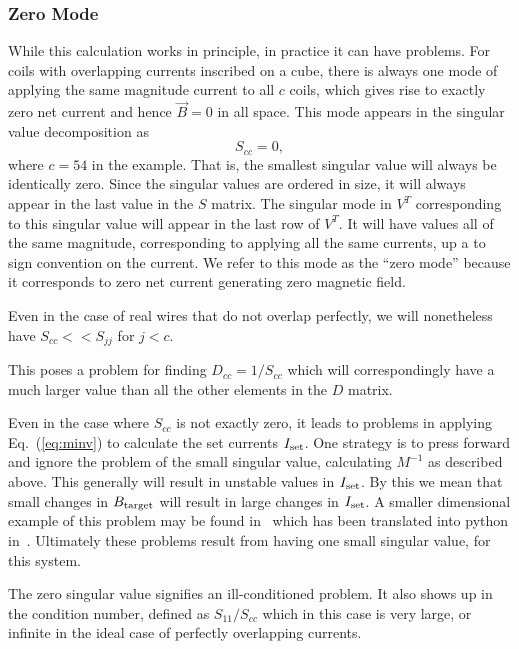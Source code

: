 \documentclass[preprint,12pt]{elsarticle}
\begin{document}
\subsubsection{Zero Mode}

While this calculation works in principle, in practice it can have
problems.  For coils with overlapping currents inscribed on a cube,
there is always one mode of applying the same magnitude current to all
$c$ coils, which gives rise to exactly zero net current and hence
$\vec{B}=0$ in all space.  This mode appears in the singular value
decomposition as
\begin{equation}
  S_{cc}=0,
\end{equation}
where $c=54$ in the example.  That is, the smallest singular value
will always be identically zero.  Since the singular values are
ordered in size, it will always appear in the last value in the $S$
matrix.  The singular mode in $V^T$ corresponding to this singular
value will appear in the last row of $V^T$.  It will have values all
of the same magnitude, corresponding to applying all the same
currents, up a to sign convention on the current.  We refer to this
mode as the ``zero mode'' because it corresponds to zero net current
generating zero magnetic field.

Even in the case of real wires that do not overlap perfectly, we will
nonetheless have $S_{cc}<<S_{jj}$ for $j<c$.

This poses a problem for finding $D_{cc}=1/S_{cc}$ which will
correspondingly have a much larger value than all the other elements
in the $D$ matrix.

Even in the case where $S_{cc}$ is not exactly zero, it leads to
problems in applying Eq.~(\ref{eq:minv}) to calculate the set currents
$I_{\rm set}$.  One strategy is to press forward and ignore the
problem of the small singular value, calculating $M^{-1}$ as described
above.  This generally will result in unstable values in $I_{\rm
  set}$.  By this we mean that small changes in $B_{\rm target}$ will
result in large changes in $I_{\rm set}$.  A smaller dimensional
example of this problem may be found in~\cite{bib:gregorcic} which has
been translated into python in~\cite{bib:test}.  Ultimately these
problems result from having one small singular value, for this system.

The zero singular value signifies an ill-conditioned problem.  It also
shows up in the condition number, defined as $S_{11}/S_{cc}$ which in
this case is very large, or infinite in the ideal case of perfectly
overlapping currents.
\end{document}
